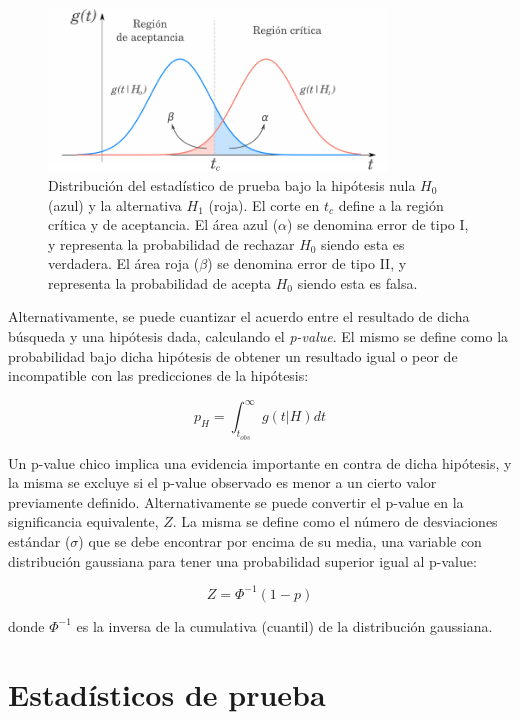 \begin{figure}
  \centering
  \includegraphics[width=0.8\textwidth]{images/statistics/hypo_test.pdf}
  \caption{Distribución del estadístico de prueba bajo la hipótesis nula $H_0$ (azul) y la alternativa $H_1$ (roja). El corte en $t_c$ define a la región crítica y de aceptancia. El área azul ($\alpha$) se denomina error de tipo I, y representa la probabilidad de rechazar $H_0$ siendo esta es verdadera. El área roja ($\beta$) se denomina error de tipo II, y representa la probabilidad de acepta $H_0$ siendo esta es falsa.}
  \label{fig:nullh}
\end{figure}


Alternativamente, se puede cuantizar el acuerdo entre el resultado de dicha búsqueda y una hipótesis dada, calculando el \textit{p-value}. El mismo se define como la probabilidad bajo dicha hipótesis de obtener un resultado igual o peor de incompatible con las predicciones de la hipótesis:

\begin{equation}
	p_H = \int_{t_{obs}}^{\infty} g(t|H)dt
\end{equation}

Un p-value chico implica una evidencia importante en contra de dicha hipótesis, y la misma se excluye si el p-value observado es menor a un cierto valor previamente definido.  Alternativamente se puede convertir el p-value en la significancia equivalente, $Z$. La misma se define como el número de desviaciones estándar ($\sigma$) que se debe encontrar por encima de su media, una variable con distribución gaussiana para tener una probabilidad superior igual al p-value:

\begin{equation}
	Z=\Phi^{-1}(1-p)
	\label{ec:sign}
\end{equation}

\noindent
donde $\Phi^{-1}$ es la inversa de la cumulativa (cuantil) de la distribución gaussiana. 


\section{Estadísticos de prueba}

